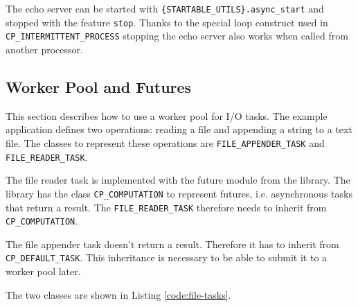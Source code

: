 The echo server can be started with \lstinline!{STARTABLE_UTILS}.async_start! and stopped with the feature \lstinline!stop!.
Thanks to the special loop construct used in \lstinline!CP_INTERMITTENT_PROCESS! stopping the echo server also works when called from another processor.

\subsection{Worker Pool and Futures}

This section describes how to use a worker pool for I/O tasks.
The example application defines two operations: reading a file and appending a string to a text file.
The classes to represent these operations are \lstinline!FILE_APPENDER_TASK! and \lstinline!FILE_READER_TASK!.

The file reader task is implemented with the future module from the library.
The library has the class \lstinline!CP_COMPUTATION! to represent futures, i.e. asynchronous tasks that return a result.
The \lstinline!FILE_READER_TASK! therefore needs to inherit from \lstinline!CP_COMPUTATION!.

The file appender task doesn't return a result.
Therefore it has to inherit from \lstinline!CP_DEFAULT_TASK!.
This inheritance is necessary to be able to submit it to a worker pool later.

The two classes are shown in Listing \ref{code:file-tasks}.

